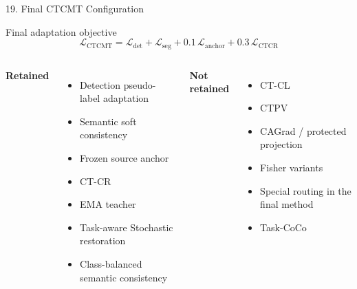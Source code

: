 \documentclass[aspectratio=169,11pt]{beamer}
\begin{document}
\begin{frame}{19. Final CTCMT Configuration}
\begin{block}{Final adaptation objective}
\[
\mathcal{L}_{\mathrm{CTCMT}}
=
\mathcal{L}_{\mathrm{det}}
+
\mathcal{L}_{\mathrm{seg}}
+
0.1\,\mathcal{L}_{\mathrm{anchor}}
+
0.3\,\mathcal{L}_{\mathrm{CTCR}}
\]
\end{block}


\begin{columns}[T]
\textbf{Retained}
\begin{itemize}
  \item Detection pseudo-label adaptation
  \item Semantic soft consistency
  \item Frozen source anchor
  \item CT-CR
  \item EMA teacher
  \item Task-aware Stochastic restoration
  \item Class-balanced semantic consistency
\end{itemize}

\textbf{Not retained}
\begin{itemize}
  \item CT-CL
  \item CTPV
  \item CAGrad / protected projection
  \item Fisher variants
  \item Special routing in the final method
  \item Task-CoCo
\end{itemize}
\end{columns}
\end{frame}


\end{document}
